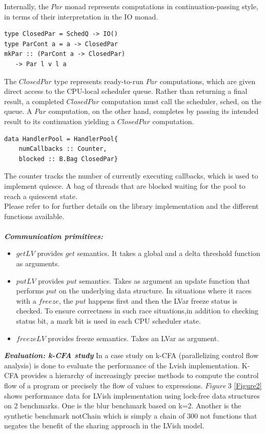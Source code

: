 \documentclass[twocolumn]{article}
\begin{document}
Internally, the $Par$ monad represents computations in continuation-passing style, in terms of their interpretation in the IO monad.
\begin{verbatim}
type ClosedPar = SchedQ -> IO()
type ParCont a = a -> ClosedPar
mkPar :: (ParCont a -> ClosedPar)
   -> Par l v l a
\end{verbatim}
The $ClosedPar$ type represents ready-to-run $Par$ computations, which are given direct access to the CPU-local scheduler queue. Rather than returning a final result, a completed $ClosedPar$ computation must call the scheduler, sched, on the queue. A $Par$
computation, on the other hand, completes by passing its intended result to its continuation yielding a $ClosedPar$ computation.
\begin{verbatim}
data HandlerPool = HandlerPool{
    numCallbacks :: Counter,
    blocked :: B.Bag ClosedPar}
\end{verbatim}
The counter tracks the number of currently executing callbacks, which is used to implement quiesce. A bag of threads that are blocked waiting for the pool to reach a quiescent state.\\ Please refer to \cite{lkuper2}\cite{kuper} for further details on the library implementation and the different functions available.\\ \\ 
\textbf{\textit{Communication primitives:}}
\begin{itemize}
\item $getLV$ provides $get$ semantics. It takes a global and a delta threshold function as arguments.
\item $putLV$ provides $put$ semantics. Takes as argument an update function that performs $put$ on the underlying data structure. In situations where it races with a $freeze$, the $put$ happens first and then the LVar freeze status is checked.
To ensure correctness in such race situations,in addition to checking status bit, a mark bit is used in each CPU scheduler state.
\item $freezeLV$ provides freeze semantics. Takes an LVar as argument.
\end{itemize}
\textbf{\textit{Evaluation: k-CFA study}} In \cite{lkuper2} a case study on k-CFA (parallelizing control flow analysis) is done to evaluate the performance of the Lvish implementation. K-CFA provides a hierarchy of increasingly precise methods to compute the control flow of a program or precisely the flow of values to expressions. $Figure\ 3$ \ref{Figure2} shows performance data for LVish implementation using lock-free data structures on 2 benchmarks. One is the blur benchmark based on k=2. Another is the synthetic benchmark notChain which is simply a chain of 300 not functions that negates the benefit of the sharing approach in the LVish model.\\ \\
\end{document}
